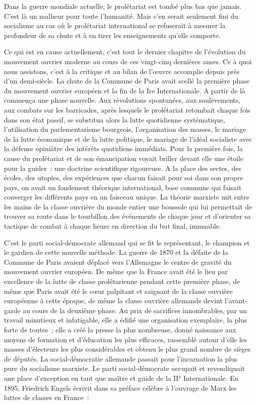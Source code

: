 \documentclass[french,twoside]{book} %
\begin{document}
Dans la guerre mondiale actuelle, le prolétariat est tombé plus bas que jamais. C'est là un malheur pour toute l’humanité. Mais c’en serait seulement fini du socialisme au cas où le prolétariat international se refuserait à mesurer la profondeur de sa chute et à en tirer les enseignements qu’elle comporte.\par
Ce qui est en cause actuellement, c’est tout le dernier chapitre de l’évolution du mouvement ouvrier moderne au cours de ces vingt-cinq dernières anses. Ce à quoi nous assistons, c’est à la critique et au bilan de l’œuvre accomplie depuis près d’un demi-siècle. La chute de la Commune de Paris avait scellé la première phase du mouvement ouvrier européen et la fin de la Ire Internationale. A partir de là commença une phase nouvelle. Aux révolutions spontanées, aux soulèvements, aux combats sur les barricades, après lesquels le prolétariat retombait chaque fois dans son état passif, se substitua alors la lutte quotidienne systématique, l’utilisation du parlementarisme bourgeois, l’organisation des masses, le mariage de la lutte économique et de la lutte politique, le mariage de l’idéal socialiste avec la défense opiniâtre des intérêts quotidiens immédiats. Pour la première fois, la cause du prolétariat et de son émancipation voyait briller devant elle une étoile pour la guider : une doctrine scientifique rigoureuse. A la place des sectes, des écoles, des utopies, des expériences que chacun faisait pour soi dans son propre pays, on avait un fondement théorique international, base commune qui faisait converger les différents pays en un faisceau unique. La théorie marxiste mit entre les mains de la classe ouvrière du monde entier une boussole qui lui permettait de trouver sa route dans le tourbillon des événements de chaque jour et d’orienter sa tactique de combat à chaque heure en direction du but final, immuable.\par
C'est le parti social-démocrate allemand qui se fit le représentant, le champion et le gardien de cette nouvelle méthode. La guerre de 1870 et la défaite de la Commune de Paris avaient déplacé vers l’Allemagne le centre de gravité du mouvement ouvrier européen. De même que la France avait été le lieu par excellence de la lutte de classe prolétarienne pendant cette première phase, de même que Paris avait été le cœur palpitant et saignant de la classe ouvrière européenne à cette époque, de même la classe ouvrière allemande devint l’avant-garde au cours de la deuxième phase. Au prix de sacrifices innombrables, par un travail minutieux et infatigable, elle a édifié une organisation exemplaire, la plus forte de toutes ; elle a créé la presse la plus nombreuse, donné naissance aux moyens de formation et d’éducation les plus efficaces, rassemblé autour d’elle les masses d’électeurs les plus considérables et obtenu le plus grand nombre de sièges de députés. La social-démocratie allemande passait pour l’incarnation la plus pure du socialisme marxiste. Le parti social-démocrate occupait et revendiquait une place d’exception en tant que maître et guide de la II° Internationale. En 1895, Friedrich Engels écrivit dans sa préface célèbre à l’ouvrage de Marx les luttes de classes en France :\par
\end{document}
